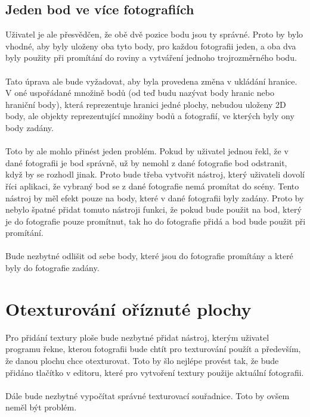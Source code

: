 \documentclass[11pt,twoside,a4paper]{book}
\begin{document}
\subsection{Jeden bod ve více fotografiích}
\label{hraniceViceBodu}
Uživatel je ale přesvědčen, že obě dvě pozice bodu jsou ty správné. Proto by bylo vhodné, aby byly uloženy oba tyto body, pro každou fotografii jeden, a oba dva byly použity při promítání do roviny a vytváření jednoho trojrozměrného bodu.
\paragraph{}
Tato úprava ale bude vyžadovat, aby byla provedena změna v ukládání hranice. V oné uspořádané množině bodů (od teď budu nazývat body hranic nebo hraniční body), která reprezentuje hranici jedné plochy, nebudou uloženy 2D body, ale objekty reprezentující množiny bodů a fotografií, ve kterých byly ony body zadány.
\paragraph{}
Toto by ale mohlo přinést jeden problém. Pokud by uživatel jednou řekl, že v dané fotografii je bod správně, už by nemohl z dané fotografie bod odstranit, když by se rozhodl jinak. Proto bude třeba vytvořit nástroj, který uživateli dovolí říci aplikaci, že vybraný bod se z dané fotografie nemá promítat do scény. Tento nástroj by měl efekt pouze na body, které v dané fotografii byly zadány. Proto by nebylo špatné přidat tomuto nástroji funkci, že pokud bude použit na bod, který je do fotografie pouze promítnut, tak ho do fotografie přidá a bod bude použit při promítání.
\paragraph{}
Bude nezbytné odlišit od sebe body, které jsou do fotografie promítány a které byly do fotografie zadány.  

\section{Otexturování oříznuté plochy}
\label{texturovaniPlochy}
Pro přidání textury ploše bude nezbytné přidat nástroj, kterým uživatel programu řekne, kterou fotografii bude chtít pro texturování použít a především, že danou plochu chce otexturovat. Toto by šlo nejlépe provést tak, že bude přidáno tlačítko v editoru, které pro vytvoření textury použije aktuální fotografii.
\paragraph{}
Dále bude nezbytné vypočítat správné texturovací souřadnice. Toto by ovšem neměl být problém. 
\end{document}
